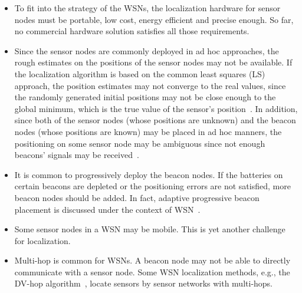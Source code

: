 \begin{itemize}
  \item To fit into the strategy of the WSNs, the localization hardware for sensor nodes must be portable, low cost, energy efficient and precise enough. So far, no commercial hardware solution satisfies all those requirements.
  \item Since the sensor nodes are commonly deployed in ad hoc approaches, the rough estimates on the positions of the sensor nodes may not be available. If the localization algorithm is based on the common least squares (LS) approach, the position estimates may not converge to the real values, since the randomly generated initial positions may not be close enough to the global minimum, which is the true value of the sensor's position~\cite{p188-biswas}.
    In addition, since both of the sensor nodes (whose positions are unknown) and the beacon nodes (whose positions are known) may be placed in ad hoc manners, the positioning on some sensor node may be ambiguous since not enough beacons' signals may be received~\cite{NiculescuPhD}.
  \item It is common to progressively deploy the beacon nodes. If the batteries on certain beacons are depleted or the positioning errors are not satisfied, more beacon nodes should be added.
    In fact, adaptive progressive beacon placement is discussed under the context of WSN~\cite{bulusu01adaptive}.
  \item Some sensor nodes in a WSN may be mobile. This is yet another challenge for localization.
  \item Multi-hop is common for WSNs. A beacon node may not be able to directly communicate with a sensor node. Some WSN localization methods, e.g., the DV-hop algorithm~\cite{bulusu01adaptive}, locate sensors by sensor networks with multi-hops.
\end{itemize}


